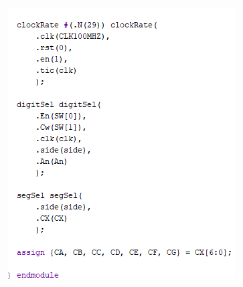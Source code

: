 \documentclass[12pt, letterpaper]{article}
\begin{document}
\includegraphics[width=0.45\textwidth]{top.sv module (bottom half).png}
\end{document}
